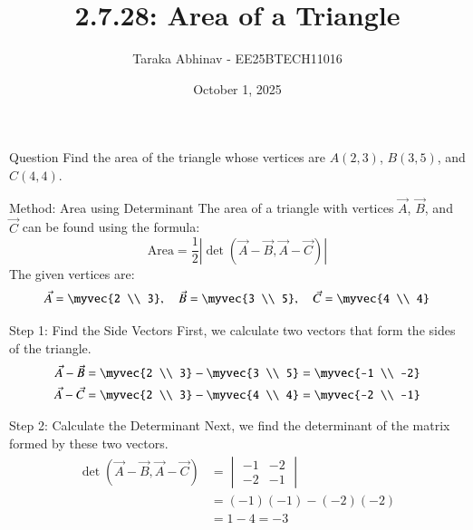 \documentclass{beamer}
\begin{document}
\title 
{2.7.28: Area of a Triangle}
\date{October 1, 2025}

\author 
{Taraka Abhinav - EE25BTECH11016}

\frame{\titlepage}

\begin{frame}{Question}
Find the area of the triangle whose vertices are $A(2,3)$, $B(3,5)$, and $C(4,4)$.
\end{frame}

\begin{frame}{Method: Area using Determinant}
The area of a triangle with vertices $\vec{A}$, $\vec{B}$, and $\vec{C}$ can be found using the formula:
\[ \text{Area} = \frac{1}{2} \left| \det(\vec{A}-\vec{B}, \vec{A}-\vec{C}) \right| \]
The given vertices are:
\[ \vec{A} = \myvec{2 \\ 3}, \quad \vec{B} = \myvec{3 \\ 5}, \quad \vec{C} = \myvec{4 \\ 4} \]
\end{frame}

\begin{frame}{Step 1: Find the Side Vectors}
First, we calculate two vectors that form the sides of the triangle.
\begin{align}
    \vec{A}-\vec{B} &= \myvec{2 \\ 3} - \myvec{3 \\ 5} = \myvec{-1 \\ -2} \label{eq:vec_ab} \\
    \vec{A}-\vec{C} &= \myvec{2 \\ 3} - \myvec{4 \\ 4} = \myvec{-2 \\ -1} \label{eq:vec_ac}
\end{align}
\end{frame}

\begin{frame}{Step 2: Calculate the Determinant}
Next, we find the determinant of the matrix formed by these two vectors.
\begin{align}
    \det(\vec{A}-\vec{B}, \vec{A}-\vec{C}) &= \begin{vmatrix} -1 & -2 \\ -2 & -1 \end{vmatrix} \nonumber \\
    &= (-1)(-1) - (-2)(-2) \nonumber \\
    &= 1 - 4 = -3 \label{eq:determinant}
\end{align}
\end{frame}
\end{document}
